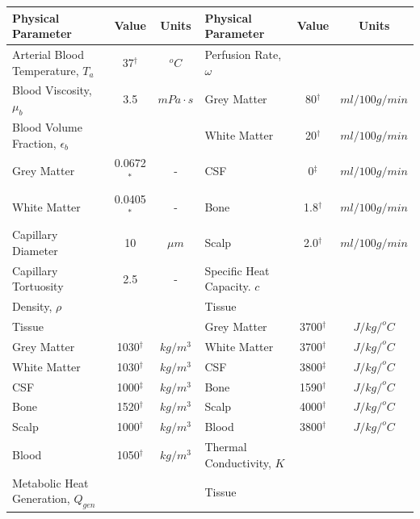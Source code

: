 \documentclass[11pt,english,a4paper,twoside,openright]{report}
\begin{document}
{{{{{{{{\begin{table}
	\centering
	\fontsize{8pt}{9pt}\selectfont
	\begin{tabular}{l c c l c c}
		\toprule
		\textbf{Physical Parameter} & \textbf{Value} & \textbf{Units} & \textbf{Physical Parameter} & \textbf{Value} & \textbf{Units} \\	
		\hline
		Arterial Blood Temperature, $T_{a}$ & 37$^{\dagger}$ & $^{o}C$ & Perfusion Rate, $\omega$ & & \\
		Blood Viscosity, $\mu_{b}$ & 3.5 & $mPa{\cdot}s$ & \qquad \qquad \qquad Grey Matter & 80$^{\dagger}$ & $ml/100g/min$ \\
		Blood Volume Fraction, $\epsilon_{b}$ & & & \qquad \qquad \qquad White Matter & 20$^{\dagger}$ & $ml/100g/min$ \\
		\qquad \qquad \qquad Grey Matter & 0.0672$^{*}$ & - & \qquad \qquad \qquad CSF & 0$^{\ddagger}$ & $ml/100g/min$ \\
		\qquad \qquad \qquad White Matter & 0.0405$^{*}$ & - & \qquad \qquad \qquad Bone & 1.8$^{\dagger}$ & $ml/100g/min$ \\ 
		Capillary Diameter & 10 & $\mu m$ & \qquad \qquad \qquad Scalp & 2.0$^{\dagger}$ & $ml/100g/min$ \\ 
		Capillary Tortuosity & 2.5 & - & Specific Heat Capacity. $c$  & &\\
		Density, $\rho$ & & & \qquad Tissue & & \\
		\qquad Tissue & & & \qquad \qquad \qquad Grey Matter & 3700$^{\dagger}$ & $J/kg/^{o}C$ \\
		\qquad \qquad \qquad Grey Matter & 1030$^{\dagger}$ & $kg/m^{3}$ & \qquad \qquad \qquad White Matter & 3700$^{\dagger}$ & $J/kg/^{o}C$ \\
		\qquad \qquad \qquad White Matter & 1030$^{\dagger}$ & $kg/m^{3}$ & \qquad \qquad \qquad CSF & 3800$^{\ddagger}$ & $J/kg/^{o}C$ \\
		\qquad \qquad \qquad CSF & 1000$^{\ddagger}$ & $kg/m^{3}$ & \qquad \qquad \qquad Bone & 1590$^{\dagger}$ & $J/kg/^{o}C$ \\
		\qquad \qquad \qquad Bone & 1520$^{\dagger}$ & $kg/m^{3}$ & \qquad \qquad \qquad Scalp & 4000$^{\dagger}$ & $J/kg/^{o}C$ \\
		\qquad \qquad \qquad Scalp & 1000$^{\dagger}$ & $kg/m^{3}$ & \qquad Blood & 3800$^{\dagger}$ & $J/kg/^{o}C$ \\
		\qquad Blood & 1050$^{\dagger}$ & $kg/m^{3}$ & Thermal Conductivity, $K$ & & \\ 
		Metabolic Heat Generation, $Q_{gen}$ &  & & \qquad Tissue & & \\

\end{tabular}
\end{table}}}}}}}}}
\end{document}
